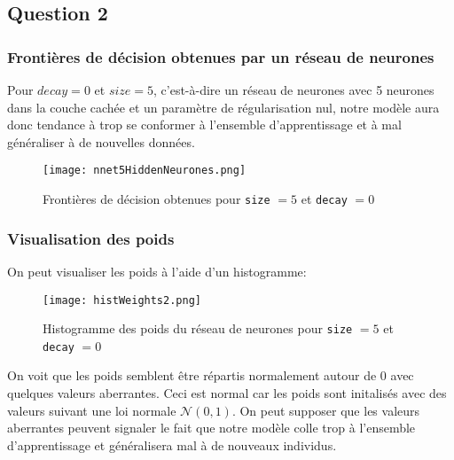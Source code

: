 \documentclass{article}
\begin{document}
\begin{multicols}{2}
\subsection{Question 2}\label{subsec:ex22}

\subsubsection{Frontières de décision obtenues par un réseau de neurones}\label{subsubsec:ex221}

Pour $decay = 0$ et $size = 5$, c'est-à-dire un réseau de neurones avec 5
neurones dans la couche cachée et un paramètre de régularisation nul, notre
modèle aura donc tendance à trop se conformer à l'ensemble d'apprentissage et à
mal généraliser à de nouvelles données.

\begin{figure}[H]
    \begin{center}
        \texttt{[image: nnet5HiddenNeurones.png]}
        \centering
        \captionsetup{justification=centering}
        \caption{\label{fig:nnet5}Frontières de décision obtenues pour \texttt{size} $= 5$ et \texttt{decay} $= 0$}
    \end{center}
\end{figure}

\subsubsection{Visualisation des poids}\label{subsubsec:ex222}

On peut visualiser les poids à l'aide d'un histogramme:

\begin{figure}[H]
    \begin{center}
        \texttt{[image: histWeights2.png]}
        \centering
        \captionsetup{justification=centering}
        \caption{\label{fig:weights}Histogramme des poids du réseau de neurones pour \texttt{size} $= 5$ et \texttt{decay} $= 0$}
    \end{center}
\end{figure}

On voit que les poids semblent être répartis normalement autour de 0 avec
quelques valeurs aberrantes. Ceci est normal car les poids sont initalisés avec
des valeurs suivant une loi normale $\mathcal{N}(0, 1)$. On peut supposer que
les valeurs aberrantes peuvent signaler le fait que notre modèle colle trop à
l'ensemble d'apprentissage et généralisera mal à de nouveaux individus.


\end{multicols}
\end{document}
